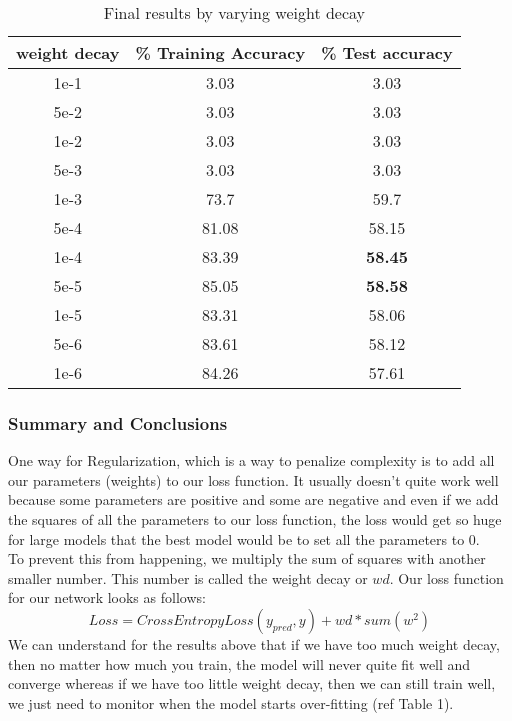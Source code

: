 \documentclass{article}
\begin{document}
\begin{table}[h!]
\begin{center}
\begin{tabular}{ |c|c|c|} 
 \hline
 weight decay & \% Training Accuracy & \% Test accuracy\\ 
 \hline
 1e-1 & 3.03 & 3.03  \\ 
 \hline
 5e-2 & 3.03  & 3.03  \\ 
\hline
 1e-2 & 3.03  & 3.03  \\ 
\hline
 5e-3 & 3.03  & 3.03  \\
\hline
 1e-3 & 73.7 & 59.7 \\
\hline
 5e-4 & 81.08 & 58.15\\
\hline
 1e-4 & 83.39 & \textbf{58.45} \\
\hline
 5e-5 & 85.05 & \textbf{58.58}\\
\hline
 1e-5 & 83.31 & 58.06 \\
\hline
 5e-6 & 83.61  & 58.12 \\
\hline
 1e-6 & 84.26  & 57.61  \\
\hline
\end{tabular}
\caption{Final results by varying weight decay }
\end{center}
\end{table}

\newpage
\subsubsection{Summary and Conclusions}

One way for Regularization, which is a way to penalize complexity is to add all our parameters (weights) to our loss function. It usually doesn't quite work well because some parameters are positive and some are negative and even if we add the squares of all the parameters to our loss function, the loss would get so huge for large models that the best model would be to set all the parameters to 0.\\

\noindent
To prevent this from happening, we multiply the sum of squares with another smaller number. This number is called the weight decay or $wd$.
Our loss function for our network looks as follows:
\begin{equation}
 Loss = CrossEntropyLoss(y_{pred}, y) + wd * sum(w^2)
\end{equation}
We can understand for the results above that if we have too much weight decay, then no matter how much you train, the model will never quite fit well and converge whereas if we have too little weight decay, then we can still train well, we just need to monitor when the model starts over-fitting (ref Table 1).\\
\end{document}
